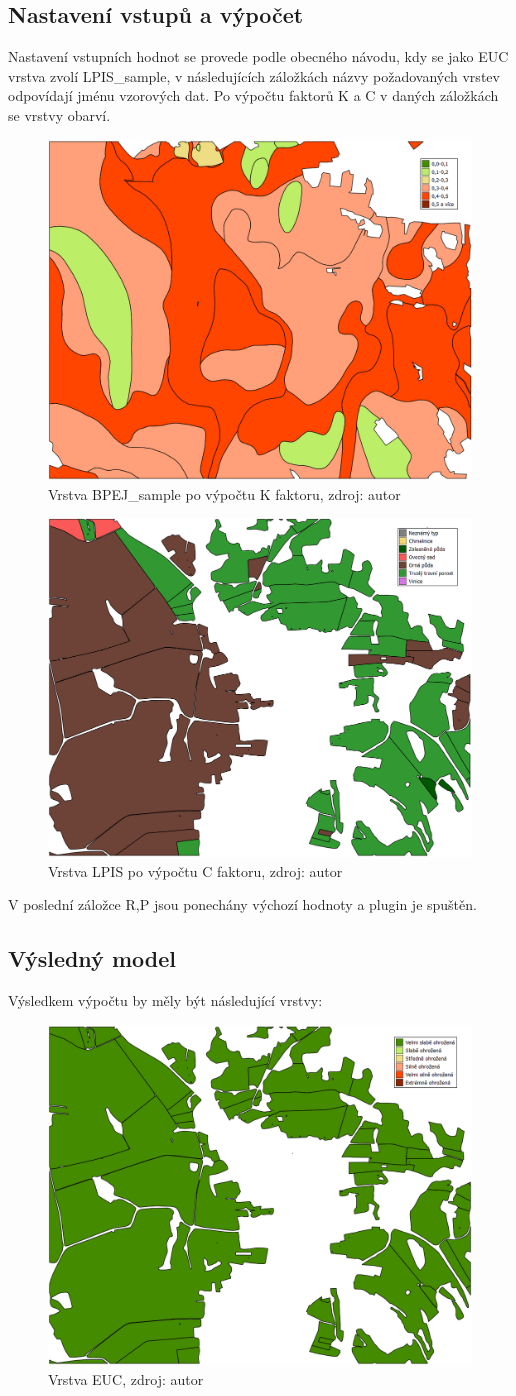 \subsection{Nastavení vstupů a výpočet} Nastavení vstupních hodnot se
provede podle obecného návodu, kdy se jako EUC vrstva zvolí
LPIS\_sample, v následujících záložkách názvy požadovaných vrstev
odpovídají jménu vzorových dat. Po výpočtu faktorů K a C v daných
záložkách se vrstvy obarví.
\begin{figure}[H] \centering
		\includegraphics[width=.5\textwidth]{./pictures/bpej_layer2.png}
		\caption[Vrstva BPEJ\_sample po výpočtu K
faktoru]{Vrstva BPEJ\_sample po výpočtu K faktoru, zdroj: autor}
		\label{bpej_sample2}
\end{figure}
\begin{figure}[H] \centering
		\includegraphics[width=.5\textwidth]{./pictures/lpis_layer2.png}
		\caption[Vrstva LPIS po výpočtu C faktoru]{Vrstva LPIS
po výpočtu C faktoru, zdroj: autor}
		\label{lpis_sample2}
\end{figure} V poslední záložce R,P jsou ponechány výchozí hodnoty a
plugin je spuštěn.
\newpage
\subsection{Výsledný model} Výsledkem výpočtu by měly být následující
vrstvy:
\begin{figure}[H] \centering
		\includegraphics[width=.5\textwidth]{./pictures/euc_layer.png}
		\caption[Vrstva EUC]{Vrstva EUC, zdroj: autor}
		\label{euc_sample}
\end{figure}
